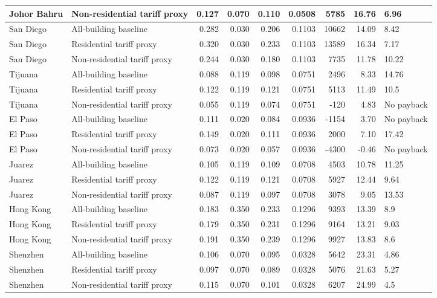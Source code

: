 {\begin{longtable}{llrrrrrrl}
Johor Bahru & Non-residential tariff proxy & 0.127 & 0.070 & 0.110 & 0.0508 & 5785 & 16.76 & 6.96 \\
\midrule
San Diego & All-building baseline & 0.282 & 0.030 & 0.206 & 0.1103 & 10662 & 14.09 & 8.42 \\
San Diego & Residential tariff proxy & 0.320 & 0.030 & 0.233 & 0.1103 & 13589 & 16.34 & 7.17 \\
San Diego & Non-residential tariff proxy & 0.244 & 0.030 & 0.180 & 0.1103 & 7735 & 11.78 & 10.22 \\
\midrule
Tijuana & All-building baseline & 0.088 & 0.119 & 0.098 & 0.0751 & 2496 & 8.33 & 14.76 \\
Tijuana & Residential tariff proxy & 0.122 & 0.119 & 0.121 & 0.0751 & 5113 & 11.49 & 10.5 \\
Tijuana & Non-residential tariff proxy & 0.055 & 0.119 & 0.074 & 0.0751 & -120 & 4.83 & No payback \\
\midrule
El Paso & All-building baseline & 0.111 & 0.020 & 0.084 & 0.0936 & -1154 & 3.70 & No payback \\
El Paso & Residential tariff proxy & 0.149 & 0.020 & 0.111 & 0.0936 & 2000 & 7.10 & 17.42 \\
El Paso & Non-residential tariff proxy & 0.073 & 0.020 & 0.057 & 0.0936 & -4300 & -0.46 & No payback \\
\midrule
Juarez & All-building baseline & 0.105 & 0.119 & 0.109 & 0.0708 & 4503 & 10.78 & 11.25 \\
Juarez & Residential tariff proxy & 0.122 & 0.119 & 0.121 & 0.0708 & 5927 & 12.44 & 9.64 \\
Juarez & Non-residential tariff proxy & 0.087 & 0.119 & 0.097 & 0.0708 & 3078 & 9.05 & 13.53 \\
\midrule
Hong Kong & All-building baseline & 0.183 & 0.350 & 0.233 & 0.1296 & 9393 & 13.39 & 8.9 \\
Hong Kong & Residential tariff proxy & 0.179 & 0.350 & 0.231 & 0.1296 & 9164 & 13.21 & 9.03 \\
Hong Kong & Non-residential tariff proxy & 0.191 & 0.350 & 0.239 & 0.1296 & 9927 & 13.83 & 8.6 \\
\midrule
Shenzhen & All-building baseline & 0.106 & 0.070 & 0.095 & 0.0328 & 5642 & 23.31 & 4.86 \\
Shenzhen & Residential tariff proxy & 0.097 & 0.070 & 0.089 & 0.0328 & 5076 & 21.63 & 5.27 \\
Shenzhen & Non-residential tariff proxy & 0.115 & 0.070 & 0.101 & 0.0328 & 6207 & 24.99 & 4.5 \\

\end{longtable}}
